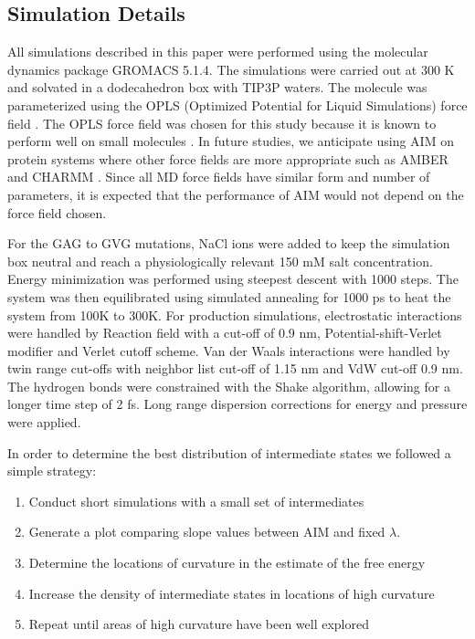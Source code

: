 \subsection{Simulation Details}

All simulations described in this paper were performed using the molecular dynamics package GROMACS 5.1.4. The simulations were carried out at 300 K and solvated in a dodecahedron box with TIP3P waters. The molecule was parameterized using the OPLS (Optimized Potential for Liquid Simulations) force field \cite{Jorgensen1996}. The OPLS force field was chosen for this study because it is known to perform well on small molecules \cite{Shirts2003}. In future studies, we anticipate using AIM on protein systems where other force fields are more appropriate such as AMBER \cite{Salomon-Ferrer2013} and CHARMM \cite{Mackerell2001}. Since all MD force fields have similar form and number of parameters, it is expected that the performance of AIM would not depend on the force field chosen. 

For the GAG to GVG mutations, NaCl ions were added to keep the simulation box neutral and reach a physiologically relevant 150 mM salt concentration. Energy minimization was performed using steepest descent with 1000 steps. The system was then equilibrated using simulated annealing for 1000 ps to heat the system from 100K to 300K. For production simulations, electrostatic interactions were handled by Reaction field with a cut-off of 0.9 nm, Potential-shift-Verlet modifier and Verlet cutoff scheme. Van der Waals interactions were handled by twin range cut-offs with neighbor list cut-off of 1.15 nm and VdW cut-off 0.9 nm. The hydrogen bonds were constrained with the Shake algorithm, allowing for a longer time step of 2 fs. Long range dispersion corrections for energy and pressure were applied. 

In order to determine the best distribution of intermediate states we followed a simple strategy:
\begin{enumerate}
\item Conduct short simulations with a small set of intermediates
\item Generate a plot comparing slope values between AIM and fixed $\lambda$.
\item Determine the locations of curvature in the estimate of the free energy
\item Increase the density of intermediate states in locations of high curvature
\item Repeat until areas of high curvature have been well explored
\end{enumerate}

